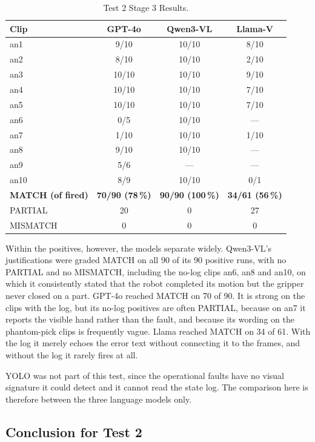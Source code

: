 \documentclass[11pt,a4paper]{article}
\begin{document}
\begin{table}[h]
\centering
\small
\setlength{\tabcolsep}{7pt}
\begin{tabular}{@{}l ccc@{}}
\toprule
Clip & GPT-4o & Qwen3-VL & Llama-V \\
\midrule
an1  & 9/10  & 10/10 & 8/10 \\
an2  & 8/10  & 10/10 & 2/10 \\
an3  & 10/10 & 10/10 & 9/10 \\
an4  & 10/10 & 10/10 & 7/10 \\
an5  & 10/10 & 10/10 & 7/10 \\
an6  & 0/5   & 10/10 & ---  \\
an7  & 1/10  & 10/10 & 1/10 \\
an8  & 9/10  & 10/10 & ---  \\
an9  & 5/6   & ---   & ---  \\
an10 & 8/9   & 10/10 & 0/1  \\
\midrule
\textbf{MATCH (of fired)} & \textbf{70/90 (78\,\%)} & \textbf{90/90 (100\,\%)}
                          & \textbf{34/61 (56\,\%)} \\
\midrule
PARTIAL   & 20 & 0 & 27 \\
MISMATCH  & 0  & 0 & 0 \\
\bottomrule
\end{tabular}
\caption{Test 2 Stage 3 Results.}
\label{tab:test2-stage3}
\end{table}
\FloatBarrier

Within the positives, however, the models separate widely. Qwen3-VL's
justifications were graded MATCH on all 90 of its 90 positive runs, with
no PARTIAL and no MISMATCH, including the no-log clips an6, an8 and an10,
on which it consistently stated that the robot completed its motion but
the gripper never closed on a part. GPT-4o reached MATCH on 70 of 90. It
is strong on the clips with the log, but its no-log positives are often
PARTIAL, because on an7 it reports the visible hand rather than the fault,
and because its wording on the phantom-pick clips is frequently vague.
Llama reached MATCH on 34 of 61. With the log it merely echoes the error
text without connecting it to the frames, and without the log it rarely
fires at all.

YOLO was not part of this test, since the operational faults have no
visual signature it could detect and it cannot read the state log. The
comparison here is therefore between the three language models only.

\subsection{Conclusion for Test 2}
\end{document}
